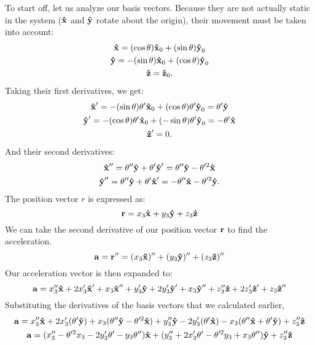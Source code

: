 To start off, let us analyze our basis vectors. Because they are not actually static in the system ($\uvec{x}$ and $\uvec{y}$ rotate about the origin), their movement must be taken into account:
\begin{gather*}
	\uvec{x} = (\cos\theta)\uvec{x}_0 + (\sin\theta)\uvec{y}_0 \\
	\uvec{y} = -(\sin\theta)\uvec{x}_0 + (\cos\theta)\uvec{y}_0 \\
	\uvec{z} = \uvec{z}_0 \text{.}
\end{gather*}
Taking their first derivatives, we get:
\begin{gather*}
	\uvec{x}' = -(\sin\theta)\theta'\uvec{x}_0 + (\cos\theta)\theta'\uvec{y}_0 = \theta'\uvec{y} \\
	\uvec{y}' = -(\cos\theta)\theta'\uvec{x}_0 + (-\sin\theta)\theta'\uvec{y}_0 = -\theta'\uvec{x} \\
	\uvec{z}' = 0 \text{.}
\end{gather*}
And their second derivatives:
\begin{gather*}
	\uvec{x}'' = \theta''\uvec{y} + \theta'\uvec{y}' = \theta''\uvec{y} - \theta'^2\uvec{x} \\
	\uvec{y}'' = \theta''\uvec{y} + \theta'\uvec{x}' = -\theta''\uvec{x} - \theta'^2\uvec{y} \text{.}
\end{gather*}
The position vector $r$ is expressed as:
\begin{equation*}
	\bvec{r} = x_3\uvec{x} + y_3\uvec{y} + z_3\uvec{z}
\end{equation*}
We can take the second derivative of our position vector $\bm{\mathbf{r}}$ to find the acceleration.
\begin{equation*}
	\bvec{a} = \bvec{r}'' = (x_3\uvec{x})'' + (y_3\uvec{y})'' + (z_3\uvec{z})''
\end{equation*}
Our acceleration vector is then expanded to:
\begin{equation*}
	\bvec{a} = x_3''\uvec{x} + 2x_3'\uvec{x}' + x_3\uvec{x}'' + y_3'\uvec{y} + 2y_3'\uvec{y}' + x_3\uvec{y}'' + z_3''\uvec{z} + 2z_3'\uvec{z}' + z_3\uvec{z}''
\end{equation*}
Substituting the derivatives of the basis vectors that we calculated earlier,
\begin{gather*}
		\bvec{a} = x_3''\uvec{x} + 2x_3'(\theta'\uvec{y}) + x_3(\theta''\uvec{y} - \theta'^2\uvec{x}) + y_3''\uvec{y} - 2y_3'(\theta'\uvec{x}) - x_3(\theta''\uvec{x} + \theta'\uvec{y}) + z_3''\uvec{z} \\
		\bvec{a} = (x_3'' - \theta'^2x_3 - 2y_3'\theta' - y_3\theta'')\uvec{x} + (y_3'' + 2x_3'\theta' - \theta'^2y_3 + x_3\theta'')\uvec{y} + z_3''\uvec{z}
\end{gather*}

